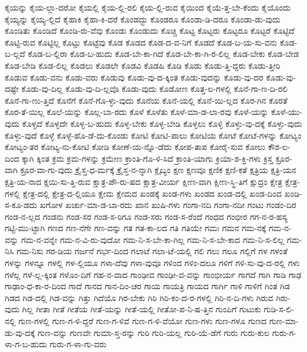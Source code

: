 {ಕೈಯನ್ನು
ಕೈಯ-ಲ್ಲಾ-ದರೋ
ಕೈಯಲ್ಲಿ
ಕೈಯ-ಲ್ಲಿ-ರಲಿ
ಕೈಯ-ಲ್ಲಿ-ರುವ
ಕೈಯಿಂದ
ಕೈಯೆ-ತ್ತ-ಬೇ-ಕೆಂದು
ಕೈಯೊಂದು
ಕೈಯ್ಯನ್ನು
ಕೈಯ್ಯ-ಲ್ಲಿದೆ
ಕೈಹಾಕಿ
ಕೈಹಾ-ಕಿ-ದರೆ
ಕೊಂಡದ್ದು
ಕೊಂಡರೂ
ಕೊಂಡಾ-ಡಿ-ದರೂ
ಕೊಂಡಾ-ಡು-ವುದು
ಕೊಂಡಿತು
ಕೊಂಡಿದೆ
ಕೊಂಡಿ-ರು-ವೆವು
ಕೊಂಡು
ಕೊಂಡುದು
ಕೊಚ್ಚಿ
ಕೊಟ್ಟ
ಕೊಟ್ಟರು
ಕೊಟ್ಟರೂ
ಕೊಟ್ಟರೆ
ಕೊಟ್ಟಿದೆ
ಕೊಟ್ಟಿ-ರುವ
ಕೊಟ್ಟಿಲ್ಲ
ಕೊಟ್ಟು
ಕೊಟ್ಟೆವು
ಕೊಡ
ಕೊಡದ
ಕೊಡ-ದ-ವ-ನಿಗೆ
ಕೊಡದೆ
ಕೊಡ-ಬ-ಯ-ಸು-ವನು
ಕೊಡ-ಬ-ಲ್ಲದೆ
ಕೊಡ-ಬ-ಲ್ಲಿರಾ
ಕೊಡ-ಬ-ಹುದು
ಕೊಡ-ಬೇ-ಕಾ-ಗಿದೆ
ಕೊಡ-ಬೇ-ಕಾ-ಗಿ-ರ-ಲಿಲ್ಲ
ಕೊಡ-ಬೇಕು
ಕೊಡ-ಬೇಡ
ಕೊಡ-ಬೇಡಿ
ಕೊಡ-ಲಿಲ್ಲ
ಕೊಡಲು
ಕೊಡಲೇ
ಕೊಡವಿ
ಕೊಡಹಿ
ಕೊಡಿ
ಕೊಡು
ಕೊಡು-ತ್ತಿ-ದ್ದರು
ಕೊಡು-ತ್ತೀರಿ
ಕೊಡುವ
ಕೊಡು-ವನು
ಕೊಡು-ವರು
ಕೊಡುವು
ಕೊಡು-ವು-ದ-ಕ್ಕಿಂತ
ಕೊಡು-ವುದನ್ನು
ಕೊಡು-ವು-ದರ
ಕೊಡು-ವು-ದಷ್ಟೇ
ಕೊಡು-ವು-ದಿಲ್ಲ
ಕೊಡು-ವು-ದಿ-ಲ್ಲವೊ
ಕೊಡು-ವುದು
ಕೊಡೋಣ
ಕೊತ್ತ-ಲ-ಗಳಲ್ಲಿ
ಕೊನೆ-ಗಾ-ಣ-ದಿ-ರಲಿ
ಕೊನೆ-ಗಾ-ಣು-ತ್ತಿದೆ
ಕೊನೆಗೆ
ಕೊನೆ-ಗೊ-ಳ್ಳು-ವುದು
ಕೊನೆಯ
ಕೊನೆ-ಯಲ್ಲಿ
ಕೊನೆ-ಯಿ-ಲ್ಲದ
ಕೊರ-ಗಿನ
ಕೊರತೆ
ಕೊರ-ತೆ-ಯಿಲ್ಲ
ಕೊಲೆ-ಯನ್ನು
ಕೊಲ್ಲ-ಬಾ-ರದು
ಕೊಳೆ
ಕೊಳೆತು
ಕೊಳೆ-ಮಾ-ಡ-ಲಾ-ರವು
ಕೊಳೆ-ಯನ್ನು
ಕೊಳೆ-ಯು-ವುದು
ಕೊಳ್ಳದೆ
ಕೊಳ್ಳದೇ
ಕೊಳ್ಳ-ಬ-ಹುದು
ಕೊಳ್ಳ-ಬೇಕು
ಕೊಳ್ಳ-ಬೇಡಿ
ಕೊಳ್ಳಲು
ಕೊಳ್ಳಿ
ಕೊಳ್ಳು-ವು-ದಕ್ಕೆ
ಕೊಳ್ಳು-ವುದು
ಕೊಳ್ಳು-ವುದೆ
ಕೊಳ್ಳೆ
ಕೊಳ್ಳೆ-ಹೊ-ಡೆ-ದು-ಕೊಂಡು
ಕೋಟಿ
ಕೋಟಿ-ಪಾಲು
ಕೋಟಿಯ
ಕೋಟೆ
ಕೋಟೆ-ಗಳನ್ನು
ಕೋಟ್ಯಂ
ಕೋಟ್ಯಂ-ತರ
ಕೋಟ್ಯ-ನು-ಕೋಟಿ
ಕೋಡಿ
ಕೋಣೆ-ಯ-ನ್ನೊ-ಡೆದು
ಕೋಪ-ತಾಪ
ಕೋರೈ-ಸುವ
ಕೋಲು
ಕೌಶ-ಲ-ದಿಂದ
ಕ್ಕಾಗಿ
ಕ್ಕಿಂತ
ಕ್ರಮ
ಕ್ರಮ-ಗಳನ್ನು
ಕ್ರಮೇಣ
ಕ್ರಾಂತಿ-ಗೊ-ಳಿ-ಸಿದೆ
ಕ್ರಾಂತಿ-ಯಾಗು
ಕ್ರಿಯಾ-ಶ-ಕ್ತಿ-ಗಳು
ಕ್ರಿಸ್ತ
ಕ್ರೂರ-ವಾಗಿ
ಕ್ರೂರ-ವಾ-ಗು-ವುದು
ಕ್ರೈಸ್ತ-ಧ-ರ್ಮಕ್ಕೆ
ಕ್ರೈಸ್ತ-ನ-ನ್ನಾಗಿ
ಕ್ಲೈಬ್ಯಂ
ಕ್ಷಣ
ಕ್ಷಣವೂ
ಕ್ಷಣಿಕ
ಕ್ಷಣಿ-ಕತೆ
ಕ್ಷತ್ರಿಯ
ಕ್ಷತ್ರಿ-ಯನ
ಕ್ಷತ್ರಿ-ಯ-ನಾದ
ಕ್ಷಯಿ-ಸು-ತ್ತಿ-ರುವ
ಕ್ಷಾತ್ರ-ಪೌ-ರು-ಷದ
ಕ್ಷಾತ್ರ-ವೀರ್ಯ
ಕ್ಷೀಣ-ವಾಗಿ
ಕ್ಷೀಣ-ಸ್ಥಿ-ತಿಗೆ
ಕ್ಷುದ್ರಂ
ಕ್ಷೇತ್ರ
ಕ್ಷೇತ್ರ-ಗಳಲ್ಲಿ
ಕ್ಷೇತ್ರ-ದಲ್ಲಿ
ಕ್ಷೇತ್ರ-ದ-ಲ್ಲಿಯೂ
ಕ್ಷೇಮ
ಕ್ಷೇಮದ
ಖಂಡಕ್ಕೆ
ಖಂಡ-ಗಳು
ಖಂಡದ
ಖಂಡ-ದಲ್ಲಿ
ಖಂಡ-ದಿಂದ
ಖಂಡಿ-ಸ-ಕೂ-ಡದು
ಖಗೋಳ
ಖರ್ಚು-ಮಾ-ಡ-ಬಾ-ರದು
ಖಾನ
ಖುಷಿ-ಗಳು
ಗಂಗಾ-ನದಿ
ಗಂಗಾ-ನದೀ
ಗಂಟು
ಗಂಡಂ-ದಿರ
ಗಂಡ-ನ-ಲ್ಲದ
ಗಂಡನು
ಗಂಡ-ಸರ
ಗಂಡ-ಸ-ರಿಗೂ
ಗಂಡ-ಸರು
ಗಂಡ-ಸ-ರೆಂದೆ
ಗಂಧದ
ಗಂಭೀರ
ಗಗ-ನ-ರ-ಹಸ್ಯ
ಗಟ್ಟಿ-ಮು-ಟ್ಟಾಗಿ
ಗಣದ
ಗಣ-ನೆಗೇ
ಗಣ-ವನ್ನು
ಗತ
ಗತ-ಕಾ-ಲದ
ಗತಿ
ಗತಿಯೇ
ಗಮಃ
ಗಮನ
ಗಮ-ನಕ್ಕೆ
ಗಮ-ನ-ವನ್ನು
ಗಮ-ನ-ವನ್ನೇ
ಗಮ-ನ-ವಿ-ರು-ವುದೋ
ಗಮ-ನಿ-ಸ-ಬೇ-ಕಾ-ಗಿಲ್ಲ
ಗಮ-ನಿ-ಸ-ಬೇ-ಕಾದ
ಗಮ-ನಿ-ಸ-ಲಿಲ್ಲ
ಗಮ-ನಿಸಿ
ಗಮ-ನಿಸು
ಗರ-ಡಿಯ
ಗರ್ಜನೆ
ಗರ್ಭ-ದಿಂದ
ಗಲಾಟೆ
ಗಲಾ-ಟೆ-ಯಲ್ಲಿ
ಗಲಿ
ಗಲು
ಗಲೂ
ಗಲ್ಲಿಗೆ
ಗಳ
ಗಳಂತೆ
ಗಳನ್ನು
ಗಳನ್ನೂ
ಗಳಲ್ಲಿ
ಗಳ-ಲ್ಲಿಯೂ
ಗಳಾ-ದೆವು
ಗಳಾ-ವುವೂ
ಗಳಿಂದ
ಗಳಿಂ-ದಲೂ
ಗಳಿಗೆ
ಗಳಿ-ಸು-ವು-ದ-ರಲ್ಲಿ
ಗಳು
ಗಳೆಲ್ಲ
ಗಳೆ-ಲ್ಲ-ಕ್ಕಿಂತ
ಗಳೊಂ-ದಿಗೆ
ಗಹ-ನ-ವಾದ
ಗಾಂಢೀವ
ಗಾಂಢೀ-ವ-ವನ್ನು
ಗಾಂಭೀರ್ಯ
ಗಾಗದೆ
ಗಾಗಿ
ಗಾಡಿ
ಗಾಢ
ಗಾಢಾಂ-ಧ-ಕಾ-ರ-ದಿಂದ
ಗಾದೆ
ಗಾನದ
ಗಾನ-ದಿಂ-ಚರ
ಗಾಯ
ಗಾಯತ್ರಿ
ಗಾಯದ
ಗಾರ್ಗಿ
ಗಾಳಿ
ಗಾಳಿಗೆ
ಗಿಂತ
ಗಿಡ
ಗಿಡದ
ಗಿಡ-ದಲ್ಲಿ
ಗಿಡ-ವನ್ನು
ಗಿತ್ತು
ಗಿದೆಯೊ
ಗಿರ-ಬೇಕು
ಗಿರಿ
ಗಿರಿ-ಕಂ-ದ-ರ-ಗಳಲ್ಲಿ
ಗಿರಿ-ನ-ದಿ-ಗಳು
ಗಿರುವ
ಗಿರು-ವುದು
ಗಿಲ್ಲ
ಗೀತಾ
ಗೀತೆ
ಗೀತೆಯ
ಗೀತೆ-ಯನ್ನು
ಗೀತೆ-ಯಲ್ಲಿ
ಗೀತೋ-ಪ-ನಿ-ಷ-ತ್ತಿನ
ಗುಂಪಿಗೆ
ಗುಟುಕು
ಗುಡಿ-ಸ-ಲಿ-ನಲ್ಲಿ
ಗುಣ-ಗಳಲ್ಲಿ
ಗುಣ-ಗ-ಳಿ-ದ್ದರೆ
ಗುಣ-ಗ-ಳಿವೆ
ಗುಣ-ಗ-ಳಿ-ವೆಯೋ
ಗುಣ-ಗಳು
ಗುಣ-ಗಳೂ
ಗುಣದ
ಗುಣ-ಮಾ-ಡು-ವು-ದಕ್ಕೆ
ಗುಣ-ವನ್ನು
ಗುಣವೇ
ಗುಮಾ-ಸ್ತ-ರನ್ನು
ಗುರಿ
ಗುರಿ-ಯಲ್ಲ
ಗುರಿ-ಯೆ-ಡೆಗೆ
ಗುರು
ಗುರು-ಕುಲ
ಗುರು-ಗ-ಳಾ-ಗ-ಬ-ಹುದು
ಗುರು-ಗ-ಳಾ-ಗು-ವರು
}
